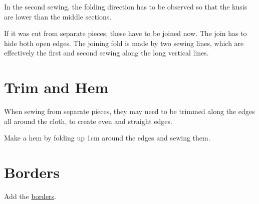 In the second sewing, the folding direction has to be observed so that
the kusis are lower than the middle sections.

If it was cut from separate pieces, these have to be joined now. The
join has to hide both open edges. The joining fold is made by two sewing
lines, which are effectively the first and second sewing along the long
vertical lines.

\section{Trim and Hem}

When sewing from separate pieces, they may need to be trimmed along the
edges all around the cloth, to create even and straight edges.

Make a hem by folding up 1cm around the edges and sewing them.

\section{Borders}

Add the \href{/en/borders}{borders}.

